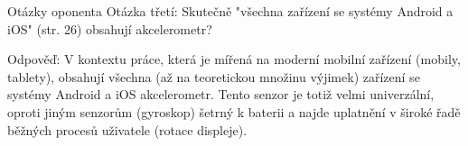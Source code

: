 \documentclass[czech,aspectratio=169]{beamer}
\begin{document}
  \begin{frame}[noframenumbering]{Otázky oponenta}
    Otázka třetí: Skutečně "všechna zařízení se systémy Android a iOS" (str. 26) obsahují akcelerometr?

    \vfill

    Odpověď:
    V kontextu práce, která je mířená na moderní mobilní zařízení
    (mobily, tablety),
    obsahují všechna (až na teoretickou množinu výjimek)
    zařízení se systémy Android a iOS akcelerometr.
    Tento senzor je totiž velmi univerzální,
    oproti jiným senzorům (gyroskop) šetrný k baterii
    a najde uplatnění v široké řadě běžných procesů uživatele (rotace displeje).
  \end{frame}
\end{document}
